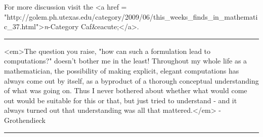 For more discussion visit the <a href = "http://golem.ph.utexas.edu/category/2009/06/this_weeks_finds_in_mathematic_37.html">\emph{n}-Category Caf&eacute;</a>.


\par\noindent\rule{\textwidth}{0.4pt}
<em>The question you raise, "how can such a formulation lead to
computations?" doesn't bother me in the least! Throughout my whole
life as a mathematician, the possibility of making explicit, elegant
computations has always come out by itself, as a byproduct of a
thorough conceptual understanding of what was going on. Thus I never
bothered about whether what would come out would be suitable for this
or that, but just tried to understand - and it always turned out that
understanding was all that mattered.</em> - Grothendieck

\par\noindent\rule{\textwidth}{0.4pt}

